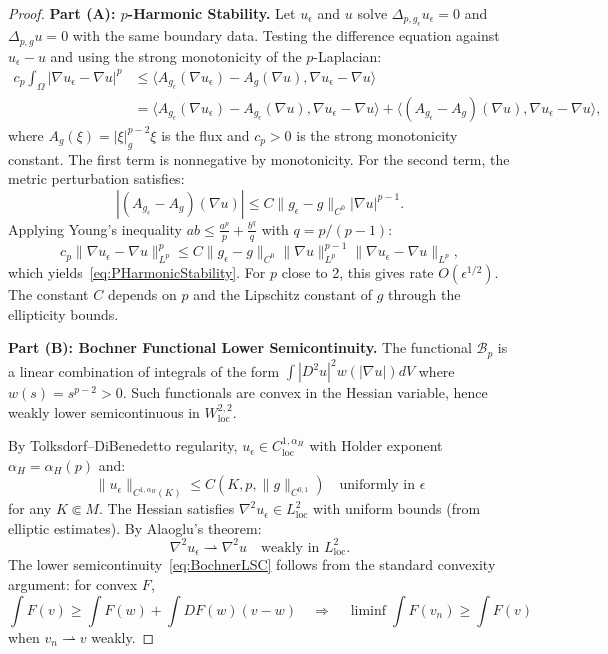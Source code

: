\begin{proof}
\textbf{Part (A): $p$-Harmonic Stability.}
Let $u_\epsilon$ and $u$ solve $\Delta_{p,g_\epsilon} u_\epsilon = 0$ and $\Delta_{p,g} u = 0$ with the same boundary data. Testing the difference equation against $u_\epsilon - u$ and using the strong monotonicity of the $p$-Laplacian:
\begin{align}
    c_p \int_\Omega |\nabla u_\epsilon - \nabla u|^p &\le \langle A_{g_\epsilon}(\nabla u_\epsilon) - A_g(\nabla u), \nabla u_\epsilon - \nabla u \rangle \\
    &= \langle A_{g_\epsilon}(\nabla u_\epsilon) - A_{g_\epsilon}(\nabla u), \nabla u_\epsilon - \nabla u \rangle + \langle (A_{g_\epsilon} - A_g)(\nabla u), \nabla u_\epsilon - \nabla u \rangle,
\end{align}
where $A_g(\xi) = |\xi|_g^{p-2} \xi$ is the flux and $c_p > 0$ is the strong monotonicity constant. The first term is nonnegative by monotonicity. For the second term, the metric perturbation satisfies:
\[
    |(A_{g_\epsilon} - A_g)(\nabla u)| \le C \|g_\epsilon - g\|_{C^0} |\nabla u|^{p-1}.
\]
Applying Young's inequality $ab \le \frac{a^p}{p} + \frac{b^q}{q}$ with $q = p/(p-1)$:
\[
    c_p \|\nabla u_\epsilon - \nabla u\|_{L^p}^p \le C \|g_\epsilon - g\|_{C^0} \|\nabla u\|_{L^p}^{p-1} \|\nabla u_\epsilon - \nabla u\|_{L^p},
\]
which yields~\eqref{eq:PHarmonicStability}. For $p$ close to 2, this gives rate $O(\epsilon^{1/2})$. The constant $C$ depends on $p$ and the Lipschitz constant of $g$ through the ellipticity bounds.

\textbf{Part (B): Bochner Functional Lower Semicontinuity.}
The functional $\mathcal{B}_p$ is a linear combination of integrals of the form $\int |D^2 u|^2 w(|\nabla u|) dV$ where $w(s) = s^{p-2} > 0$. Such functionals are convex in the Hessian variable, hence weakly lower semicontinuous in $W^{2,2}_{\mathrm{loc}}$.

By Tolksdorf--DiBenedetto regularity, $u_\epsilon \in C^{1,\alpha_H}_{\mathrm{loc}}$ with Holder exponent $\alpha_H = \alpha_H(p)$ and:
\begin{equation}
    \|u_\epsilon\|_{C^{1,\alpha_H}(K)} \le C(K, p, \|g\|_{C^{0,1}}) \quad \text{uniformly in } \epsilon
\end{equation}
for any $K \Subset M$. The Hessian satisfies $\nabla^2 u_\epsilon \in L^2_{\mathrm{loc}}$ with uniform bounds (from elliptic estimates). By Alaoglu's theorem:
\[
    \nabla^2 u_\epsilon \rightharpoonup \nabla^2 u \quad \text{weakly in } L^2_{\mathrm{loc}}.
\]
The lower semicontinuity~\eqref{eq:BochnerLSC} follows from the standard convexity argument: for convex $F$,
\[
    \int F(v) \ge \int F(w) + \int DF(w)(v-w) \quad \Rightarrow \quad \liminf \int F(v_n) \ge \int F(v)
\]
when $v_n \rightharpoonup v$ weakly.


\end{proof}
